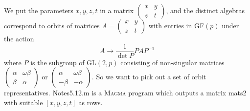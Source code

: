 \documentclass[12pt]{article}
\begin{document}
We put the parameters $x,y,z,t$ in a matrix $\left( 
\begin{array}{ll}
x & y \\ 
z & t%
\end{array}%
\right) $, and the distinct algebras correspond to orbits of matrices $%
A=\left( 
\begin{array}{ll}
x & y \\ 
z & t%
\end{array}%
\right) $ with entries in GF$(p)$ under the action%
\[
A\rightarrow \frac{1}{\det P}PAP^{-1}
\]%
where $P$ is the subgroup of GL$(2,p)$ consisting of non-singular matrices $%
\left( 
\begin{array}{ll}
\alpha  & \omega \beta  \\ 
\beta  & \alpha 
\end{array}%
\right) $ or $\left( 
\begin{array}{ll}
\alpha  & \omega \beta  \\ 
-\beta  & -\alpha 
\end{array}%
\right) $. So we want to pick out a set of orbit representatives.
Notes5.12.m is a \textsc{Magma} program which outputs a matrix mats2 with
suitable $[x,y,z,t]$ as rows.
\end{document}
